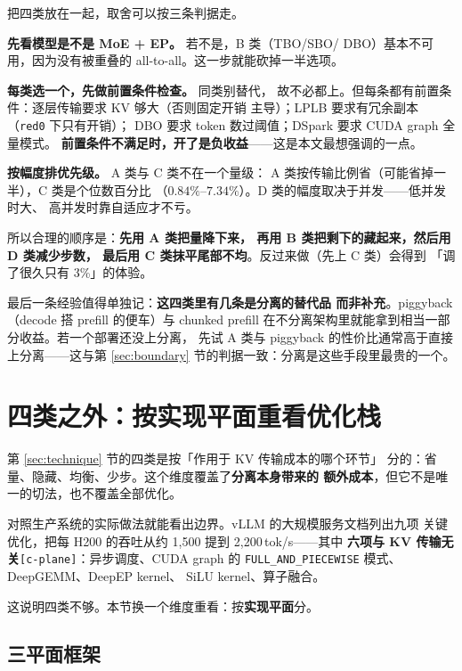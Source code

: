 把四类放在一起，取舍可以按三条判据走。

\noindent\textbf{ 先看模型是不是 MoE + EP。} 若不是，B 类（TBO/SBO/
DBO）基本不可用，因为没有被重叠的 all-to-all。这一步就能砍掉一半选项。

\noindent\textbf{ 每类选一个，先做前置条件检查。} 同类别替代，
故不必都上。但每条都有前置条件：逐层传输要求 KV 够大（否则固定开销
主导）；LPLB 要求有冗余副本（\texttt{red0} 下只有开销）；
DBO 要求 token 数过阈值；DSpark 要求 CUDA graph 全量模式。
\textbf{前置条件不满足时，开了是负收益}——这是本文最想强调的一点。

\noindent\textbf{ 按幅度排优先级。} A 类与 C 类不在一个量级：
A 类按传输比例省（可能省掉一半），C 类是个位数百分比
（$0.84\%$--$7.34\%$）。D 类的幅度取决于并发——低并发时大、
高并发时靠自适应才不亏。

\noindent 所以合理的顺序是：\textbf{先用 A 类把量降下来，
再用 B 类把剩下的藏起来，然后用 D 类减少步数，
最后用 C 类抹平尾部不均}。反过来做（先上 C 类）会得到
「调了很久只有 3\%」的体验。

\noindent 最后一条经验值得单独记：\textbf{这四类里有几条是分离的替代品
而非补充}。piggyback（decode 搭 prefill 的便车）与 chunked prefill
在不分离架构里就能拿到相当一部分收益。若一个部署还没上分离，
先试 A 类与 piggyback 的性价比通常高于直接上分离——这与第
\ref{sec:boundary} 节的判据一致：分离是这些手段里最贵的一个。

\section{四类之外：按实现平面重看优化栈}
\label{sec:plane}

第 \ref{sec:technique} 节的四类是按「作用于 KV 传输成本的哪个环节」
分的：省量、隐藏、均衡、少步。这个维度覆盖了\textbf{分离本身带来的
额外成本}，但它不是唯一的切法，也不覆盖全部优化。

对照生产系统的实际做法就能看出边界。vLLM 的大规模服务文档列出九项
关键优化，把每 H200 的吞吐从约 1{,}500 提到 2{,}200\,tok/s——其中
\textbf{六项与 KV 传输无关}\texttt{[c-plane]}：异步调度、CUDA graph 的
\texttt{FULL\_AND\_PIECEWISE} 模式、DeepGEMM、DeepEP kernel、
SiLU kernel、算子融合。

这说明四类不够。本节换一个维度重看：按\textbf{实现平面}分。

\subsection{三平面框架}

